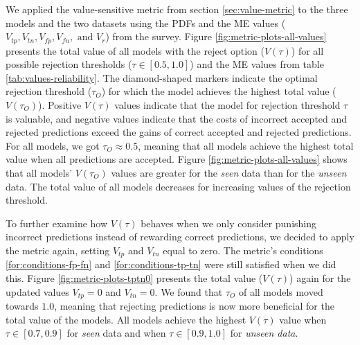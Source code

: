 %
We applied the value-sensitive metric from section \ref{sec:value-metric} to the three models and the two datasets using the PDFs and the ME values ($V_{tp}, V_{tn}, V_{fp}, V_{fn}, \text{ and } V_r$) from the survey.
%
Figure \ref{fig:metric-plots-all-values} presents the total value of all models with the reject option ($V(\tau)$) for all possible rejection thresholds ($\tau \in [0.5, 1.0]$) and the ME values from table \ref{tab:values-reliability}.
%
The diamond-shaped markers indicate the optimal rejection threshold ($\tau_O$) for which the model achieves the highest total value ($V(\tau_O)$).
%
Positive $V(\tau)$ values indicate that the model for rejection threshold $\tau$ is valuable, and negative values indicate that the costs of incorrect accepted and rejected predictions exceed the gains of correct accepted and rejected predictions.
%
For all models, we got $\tau_O \approx 0.5$, meaning that all models achieve the highest total value when all predictions are accepted.
%
Figure \ref{fig:metric-plots-all-values} shows that all models' $V(\tau_O)$ values are greater for the \emph{seen} data than for the \emph{unseen} data.
%
The total value of all models decreases for increasing values of the rejection threshold.
%

%
To further examine how $V(\tau)$ behaves when we only consider punishing incorrect predictions instead of rewarding correct predictions, we decided to apply the metric again, setting $V_{tp}$ and $V_{tn}$ equal to zero.
%
The metric's conditions \ref{for:conditions-fp-fn} and \ref{for:conditions-tp-tn} were still satisfied when we did this.
%
Figure \ref{fig:metric-plots-tptn0} presents the total value ($V(\tau)$) again for the updated values $V_{tp}=0$ and $V_{tn}=0$.
%
We found that $\tau_O$ of all models moved towards $1.0$, meaning that rejecting predictions is now more beneficial for the total value of the models.
%
All models achieve the highest $V(\tau)$ value when $\tau \in [0.7, 0.9]$ for \emph{seen} data and when $\tau \in [0.9, 1.0]$ for \emph{unseen data}.
%

